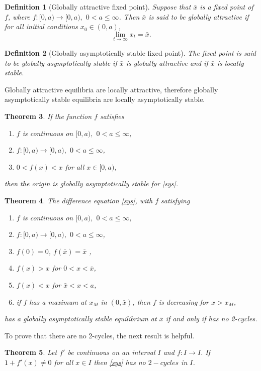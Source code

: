 \documentclass[12pt]{article}
\theoremstyle{plain}
\newtheorem{theorem}{Theorem}[section]
\newtheorem{definition}[theorem]{Definition}
\begin{document}
\begin{definition}[Globally attractive fixed point]
Suppose that $\bar x$ is a fixed point of $f$,
where $f: [0,a)\rightarrow [0,a),$ $0<a\leq \infty$. Then $\bar x$ is said to be \emph{globally attractive} if for all initial conditions $x_0\in (0,a)$, $$\lim_{t\rightarrow \infty}x_t=\bar x.$$
\end{definition}

\begin{definition}[Globally asymptotically stable fixed point]
The fixed point is said to be \emph{globally asymptotically stable} if $\bar x$ is globally attractive and if $\bar x$ is locally stable.
\end{definition}
Globally attractive equilibria are locally attractive, therefore globally asymptotically stable equilibria are locally asymptotically stable.


\begin{theorem}\label{th:gas_1}
If the function $f$ satisfies
\begin{enumerate}
\item $f$ is continuous on $[0,a),$ $0<a\leq \infty$,
\item $f: [0,a)\rightarrow [0,a),$ $0<a\leq \infty$,
\item $0<f(x)<x$ for all $x\in [0,a)$,
\end{enumerate}
then the origin is globally asymptotically stable for \eqref{sys}.
\end{theorem}

\begin{theorem}\label{th:gas_2}
The difference equation \eqref{sys}, with $f$ satisfying 
\begin{enumerate}
\item $f$ is continuous on $[0,a),$ $0<a\leq \infty$,
\item $f: [0,a)\rightarrow [0,a),$ $0<a\leq \infty$,
\item $f(0)=0$, $f(\bar x)=\bar x$ ,
\item $f(x)>x$ for $0<x<\bar x$,
\item $f(x)<x$ for $\bar x<x<a$,
\item if $f$ has a maximum at $x_M$ in $(0,\bar x)$, then $f$ is decreasing for $x>x_M$,
\end{enumerate}
has a globally asymptotically stable equilibrium at $\bar x$ if and only if has no 2-cycles.
\end{theorem}

To prove that there are no 2-cycles, the next result is helpful.
\begin{theorem}\label{th:no_cycles}
Let $f'$ be continuous on an interval $I$ and $f: I\rightarrow I$. If $1+f'(x)\not =0$ for all $x\in I$ then \eqref{sys} has no $2-cycles$ in $I$.
\end{theorem}
\end{document}

